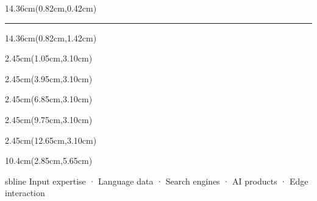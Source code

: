 \begin{frame}[plain]
\begin{textblock*}{14.36cm}(0.82cm,0.42cm)
  \par
  \vspace{0.08cm}
  {\color{SBPrimary}\rule{2.25cm}{1.3pt}}
\end{textblock*}

\begin{textblock*}{14.36cm}(0.82cm,1.42cm)
\end{textblock*}

\begin{textblock*}{2.45cm}(1.05cm,3.10cm)
\end{textblock*}
\begin{textblock*}{2.45cm}(3.95cm,3.10cm)
\end{textblock*}
\begin{textblock*}{2.45cm}(6.85cm,3.10cm)
\end{textblock*}
\begin{textblock*}{2.45cm}(9.75cm,3.10cm)
\end{textblock*}
\begin{textblock*}{2.45cm}(12.65cm,3.10cm)
\end{textblock*}

\begin{textblock*}{10.4cm}(2.85cm,5.65cm)
\begin{beamercolorbox}[wd=10.4cm,ht=0.88cm,dp=0.12cm,sep=0.10cm,center,rounded=true,shadow=false]{sbline}
{\SBFontBody\fontsize{8.6}{10.6}\selectfont\color{SBMuted}Input expertise · Language data · Search engines · AI products · Edge interaction}
\end{beamercolorbox}
\end{textblock*}
\SBFixedFooter
\end{frame}
